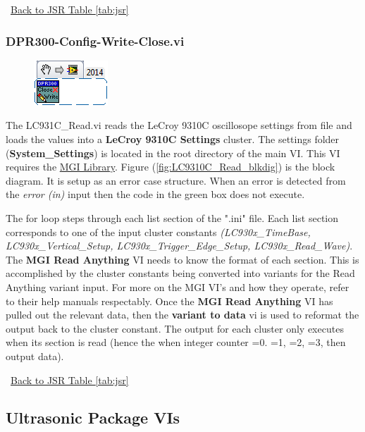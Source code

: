 \documentclass[11pt,a4paper,oldfontcommands]{memoir}
\begin{document}
\noindent\hrulefill\, \hyperref[tab:jsr]{Back to JSR Table \ref{tab:jsr}}

\subsubsection{DPR300-Config-Write-Close.vi} \label{DPR300_cwc}
\noindent\hrulefill

\begin{figure}[h]
	\includegraphics[scale=0.625]{DPR300-Config-Write-Close_main_01}
	\label{fig:DPR300-Config-Write-Close_main_01}
\end{figure}

The LC931C\_Read.vi reads the LeCroy 9310C oscillosope settings from file and loads the values into a \textbf{LeCroy 9310C Settings} cluster. The settings folder (\textbf{System\_Settings}) is located in the root directory of the main VI. This VI requires the \href{http://sine.ni.com/nips/cds/view/p/lang/en/nid/209753}{MGI Library}. Figure (\ref{fig:LC9310C_Read_blkdig}) is the block diagram.  It is setup as an error case structure. When an error is detected from the \textit{error (in)} input then the code in the green box does not execute.

The for loop steps through each list section of the ".ini" file. Each list section corresponds to one of the input cluster constants \textit{(LC930x\_TimeBase, LC930x\_Vertical\_Setup, LC930x\_Trigger\_Edge\_Setup, LC930x\_Read\_Wave)}. The \textbf{MGI Read Anything} VI needs to know the format of each section. This is accomplished by the cluster constants being converted into variants for the Read Anything variant input.  For more on the MGI VI's and how they operate, refer to their help manuals respectably. Once the \textbf{MGI Read Anything} VI has pulled out the relevant data, then the \textbf{variant to data} vi is used to reformat the output back to the cluster constant. The output for each cluster only executes when its section is read (hence the when integer counter =0. =1, =2, =3, then output data).

\noindent\hrulefill\, \hyperref[tab:jsr]{Back to JSR Table \ref{tab:jsr}}

\newpage

\subsection{Ultrasonic Package VIs}
\end{document}

